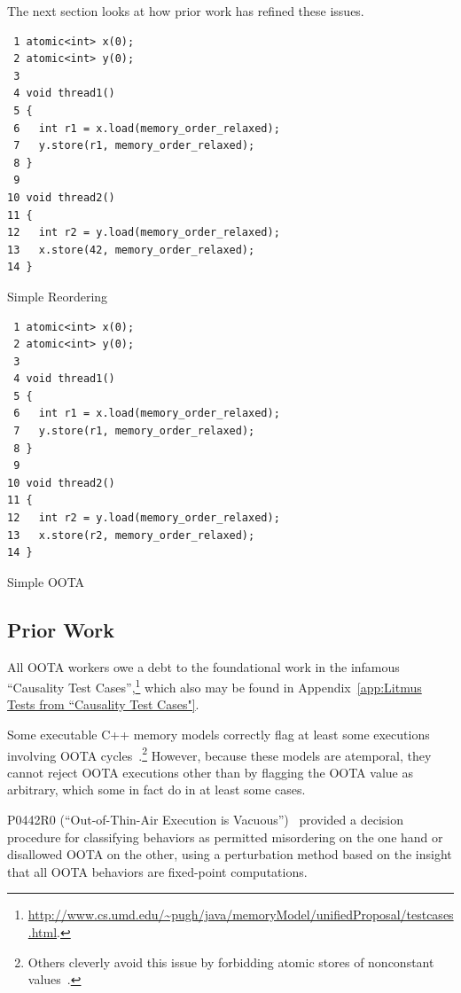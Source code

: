 \documentclass[10]{article}
\begin{document}
The next section looks at how prior work has refined these issues.

\begin{listing}[tbp]
\begin{verbatim}
 1 atomic<int> x(0);
 2 atomic<int> y(0);
 3
 4 void thread1()
 5 {
 6   int r1 = x.load(memory_order_relaxed);
 7   y.store(r1, memory_order_relaxed);
 8 }
 9
10 void thread2()
11 {
12   int r2 = y.load(memory_order_relaxed);
13   x.store(42, memory_order_relaxed);
14 }
\end{verbatim}
\caption{Simple Reordering}
\label{lst:Simple Reordering}
\end{listing}

\begin{listing}[tbp]
\begin{verbatim}
 1 atomic<int> x(0);
 2 atomic<int> y(0);
 3
 4 void thread1()
 5 {
 6   int r1 = x.load(memory_order_relaxed);
 7   y.store(r1, memory_order_relaxed);
 8 }
 9
10 void thread2()
11 {
12   int r2 = y.load(memory_order_relaxed);
13   x.store(r2, memory_order_relaxed);
14 }
\end{verbatim}
\caption{Simple OOTA}
\label{lst:Simple OOTA}
\end{listing}

\subsection{Prior Work}
\label{sec:Prior Work}

All OOTA workers owe a debt to the foundational work in the infamous
``Causality Test Cases'',\footnote{
	\url{http://www.cs.umd.edu/~pugh/java/memoryModel/unifiedProposal/testcases.html}.}
which also may be found in
Appendix~\ref{app:Litmus Tests from “Causality Test Cases"}.

Some executable C++ memory models correctly flag at least some executions
involving OOTA cycles~\cite{JadeAlglave2014HerdingCats}.\footnote{
	Others cleverly avoid this issue by forbidding atomic
	stores of nonconstant values~\cite{MarkBatty2011cppmem}.}
However, because these models are atemporal, they cannot reject
OOTA executions other than by flagging the OOTA value as arbitrary,
which some in fact do in at least some cases.

P0442R0 (``Out-of-Thin-Air Execution is Vacuous'')~\cite{PaulEMcKenney2016OOTA}
provided a decision procedure for classifying behaviors as permitted
misordering on the one hand or disallowed OOTA on the other, using
a perturbation method based on the insight that all OOTA behaviors are
fixed-point computations.
\end{document}
